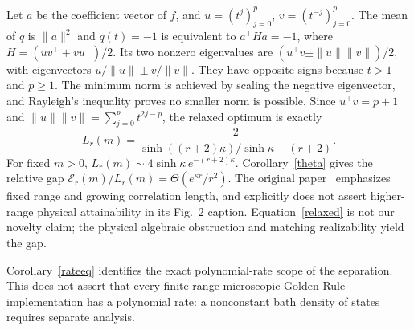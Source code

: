 \documentclass[11pt]{article}
\newcommand{\opt}{\mathcal E_r(m)}
\begin{document}
Let $a$ be the coefficient vector of $f$, and $u=(t^j)_{j=0}^{p}$, $v=(t^{-j})_{j=0}^{p}$. The mean of $q$ is $\|a\|^2$ and $q(t)=-1$ is equivalent to $a^\top Ha=-1$, where $H=(uv^\top+vu^\top)/2$. Its two nonzero eigenvalues are $(u^\top v\pm\|u\|\|v\|)/2$, with eigenvectors $u/\|u\|\pm v/\|v\|$. They have opposite signs because $t>1$ and $p\ge1$. The minimum norm is achieved by scaling the negative eigenvector, and Rayleigh's inequality proves no smaller norm is possible. Since $u^\top v=p+1$ and $\|u\|\|v\|=\sum_{j=0}^p t^{2j-p}$, the relaxed optimum is exactly
\begin{equation}\label{relaxed}
L_r(m)=\frac{2}{\sinh((r+2)\kappa)/\sinh\kappa-(r+2)}.
\end{equation}
For fixed $m>0$, $L_r(m)\sim4\sinh\kappa\,e^{-(r+2)\kappa}$. Corollary~\ref{theta} gives the relative gap $\opt/L_r(m)=\Theta(e^{\kappa r}/r^2)$. The original paper~\cite{gopal} emphasizes fixed range and growing correlation length, and explicitly does not assert higher-range physical attainability in its Fig.~2 caption. Equation~\eqref{relaxed} is not our novelty claim; the physical algebraic obstruction and matching realizability yield the gap.

Corollary~\ref{rateeq} identifies the exact polynomial-rate scope of the separation. This does not assert that every finite-range microscopic Golden Rule implementation has a polynomial rate: a nonconstant bath density of states requires separate analysis.
\end{document}

